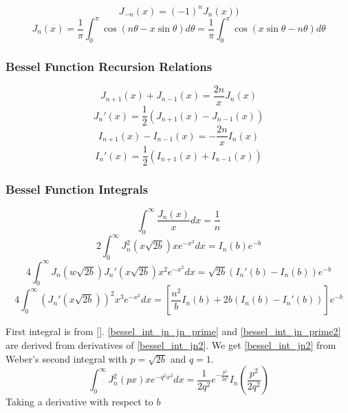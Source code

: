 \begin{equation}
	J_{-n}(x) = (-1)^nJ_n(x))
\end{equation}
\begin{equation}
	J_n(x) = \frac{1}{\pi} \int_0^\pi \cos\left(n\theta - x \sin \theta \right)d\theta = \frac{1}{\pi} \int_0^\pi \cos \left( x \sin \theta - n \theta \right) d\theta
\end{equation}

\subsubsection{Bessel Function Recursion Relations}
\begin{equation}
	J_{n+1}(x) + J_{n-1}(x) = \frac{2n}{x}J_n(x)
\end{equation}
\begin{equation}
	J_n'(x) = \frac{1}{2} \left( J_{n+1}(x) - J_{n-1}(x) \right)
\end{equation}
\begin{equation}
	I_{n+1}(x) - I_{n-1}(x) = -\frac{2n}{x}I_n(x)
\end{equation}
\begin{equation}
	I_n'(x) = \frac{1}{2} \left( I_{n+1}(x) + I_{n-1}(x) \right)
\end{equation}

\subsubsection{Bessel Function Integrals}
\begin{equation}
	\int_0^\infty \frac{J_n (x)}{x} dx = \frac{1}{n}
\end{equation}
\begin{equation}\label{bessel_int_jn2}
	2\int_0^\infty J_n^2 \left( x \sqrt{2b} \right) x e^{-x^2} dx = I_n(b) e^{-b}
\end{equation}
\begin{equation}\label{bessel_int_jn_jn_prime}
	4\int_0^\infty J_n \left( w \sqrt{2b} \right) J_n' \left( x \sqrt{2b} \right) x^2 e^{-x^2} dx = \sqrt{2b} \left(I_n'(b) - I_n(b) \right) e^{-b}
\end{equation}
\begin{equation}\label{bessel_int_jn_prime2}
	4\int_0^\infty \left(J_n' \left( x \sqrt{2b} \right) \right)^2 x^3 e^{-x^2} dx = \left[ \frac{n^2}{b}I_n(b) + 2b \left( I_n(b) - I_n'(b) \right) \right] e^{-b}
\end{equation}

First integral is from []. \eqref{bessel_int_jn_jn_prime} and \eqref{bessel_int_jn_prime2} are derived from derivatives of \eqref{bessel_int_jn2}. We get \eqref{bessel_int_jn2} from Weber's second integral with $p = \sqrt{2b}$ and $q=1$.
\begin{equation}
	\int_0^\infty J_n^2 \left( px \right) x e^{-q^2x^2} dx = \frac{1}{2q^2} e^{-\frac{p^2}{2q^2}} I_n \left( \frac{p^2}{2q^2} \right)
\end{equation}
Taking a derivative with respect to $b$

